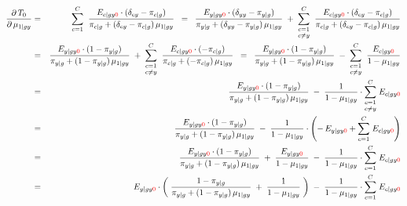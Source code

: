 \begin{eqnarray*}
\dfrac{\partial\,T_{0}}{\partial\,\mu_{1 \vert gy}}
&=&
	\overset{C}{\underset{c=1}{\sum}}\;\;
	\dfrac{E_{c \vert gy{\color{red}0}} \cdot (\delta_{cy}-\pi_{c \vert g})}{
		\pi_{c \vert g} + (\delta_{cy}-\pi_{c \vert g})\,\mu_{1\vert gy}
		}
\;\;=\;\;
	\dfrac{E_{y \vert gy{\color{red}0}} \cdot (\delta_{yy}-\pi_{y \vert g})}{
		\pi_{y \vert g} + (\delta_{yy}-\pi_{y \vert g})\,\mu_{1\vert gy}
		}
	\; + \;
	\underset{c\neq y}{\overset{C}{\underset{c=1}{\sum}}}\;\;
	\dfrac{E_{c \vert gy{\color{red}0}} \cdot (\delta_{cy}-\pi_{c \vert g})}{
		\pi_{c \vert g} + (\delta_{cy}-\pi_{c \vert g})\,\mu_{1\vert gy}
		}
\\
&=&
	\dfrac{E_{y \vert gy{\color{red}0}} \cdot (1-\pi_{y \vert g})}{
		\pi_{y \vert g} + (1-\pi_{y \vert g})\,\mu_{1\vert gy}
		}
	\; + \;
	\underset{c\neq y}{\overset{C}{\underset{c=1}{\sum}}}\;\;
	\dfrac{E_{c \vert gy{\color{red}0}} \cdot (-\pi_{c \vert g})}{
		\pi_{c \vert g} + (-\pi_{c \vert g})\,\mu_{1\vert gy}
		}
\;\;=\;\;
	\dfrac{E_{y \vert gy{\color{red}0}} \cdot (1-\pi_{y \vert g})}{
		\pi_{y \vert g} + (1-\pi_{y \vert g})\,\mu_{1\vert gy}
		}
	\; - \;
	\underset{c\neq y}{\overset{C}{\underset{c=1}{\sum}}}\;\;
	\dfrac{E_{c \vert gy{\color{red}0}}}{1 - \mu_{1\vert gy}}
\\
&=&
	\dfrac{E_{y \vert gy{\color{red}0}} \cdot (1-\pi_{y \vert g})}{
		\pi_{y \vert g} + (1-\pi_{y \vert g})\,\mu_{1\vert gy}
		}
	\; - \;
	\dfrac{1}{1 - \mu_{1\vert gy}}
	\cdot
	\underset{c\neq y}{\overset{C}{\underset{c=1}{\sum}}}\; E_{c \vert gy{\color{red}0}}
\\
&=&
	\dfrac{E_{y \vert gy{\color{red}0}} \cdot (1-\pi_{y \vert g})}{
		\pi_{y \vert g} + (1-\pi_{y \vert g})\,\mu_{1\vert gy}
		}
	\; - \;
	\dfrac{1}{1 - \mu_{1\vert gy}}
	\cdot
	\left(-\,E_{y \vert gy{\color{red}0}} + \overset{C}{\underset{c=1}{\sum}}\; E_{c \vert gy{\color{red}0}}\right)
\\
&=&
	\dfrac{E_{y \vert gy{\color{red}0}} \cdot (1-\pi_{y \vert g})}{
		\pi_{y \vert g} + (1-\pi_{y \vert g})\,\mu_{1\vert gy}
		}
	\; + \; \dfrac{E_{y \vert gy{\color{red}0}}}{1 - \mu_{1\vert gy}}
	\; - \; \dfrac{1}{1 - \mu_{1\vert gy}} \cdot \overset{C}{\underset{c=1}{\sum}}\; E_{c \vert gy{\color{red}0}}
\\
&=&
	E_{y \vert gy{\color{red}0}} \cdot
	\left(\;
		\dfrac{1-\pi_{y \vert g}}{\pi_{y \vert g} + (1-\pi_{y \vert g})\,\mu_{1\vert gy} }
		\; + \;
		\dfrac{1}{1 - \mu_{1\vert gy}}
	\;\right)
	\; - \; \dfrac{1}{1 - \mu_{1\vert gy}} \cdot \overset{C}{\underset{c=1}{\sum}}\; E_{c \vert gy{\color{red}0}}
\end{eqnarray*}

